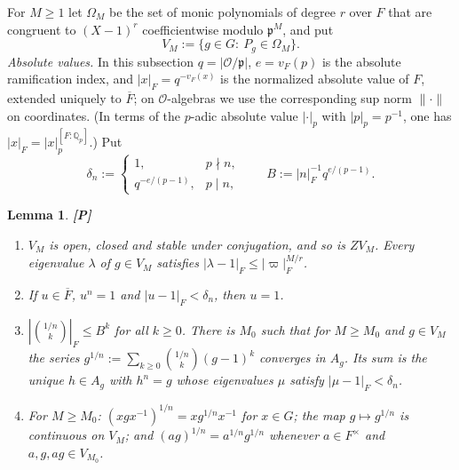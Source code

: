 \documentclass[12pt]{article}
\newcommand{\ov}[1]{\overline{#1}}
\newcommand{\cO}{\mathcal{O}}
\newcommand{\fp}{\mathfrak{p}}
\newcommand{\Pv}{\textbf{[P]}}
\theoremstyle{plain}
\newtheorem{lemma}[theorem]{Lemma}
\theoremstyle{definition}
\begin{document}
For $M\ge1$ let $\Omega_M$ be the set of monic polynomials of degree $r$ over $F$ that are congruent to $(X-1)^r$ coefficientwise modulo $\fp^M$, and put
\[ V_M:=\{g\in G:\ P_g\in\Omega_M\}. \]
\emph{Absolute values.} In this subsection $q=|\cO/\fp|$, $e=v_F(p)$ is the absolute ramification index, and $|x|_F=q^{-v_F(x)}$ is the normalized absolute value of $F$, extended uniquely to $\ov F$; on $\cO$-algebras we use the corresponding sup norm $\|\cdot\|$ on coordinates. (In terms of the $p$-adic absolute value $|\cdot|_p$ with $|p|_p=p^{-1}$, one has $|x|_F=|x|_p^{[F:\mathbb Q_p]}$.) Put
\[ \delta_n:=\begin{cases}1,&p\nmid n,\\ q^{-e/(p-1)},&p\mid n,\end{cases}\qquad B:=|n|_F^{-1}q^{e/(p-1)}. \]

\begin{lemma}\label{lem:roots}\Pv
\begin{enumerate}[label=(\alph*)]
\item $V_M$ is open, closed and stable under conjugation, and so is $ZV_M$. Every eigenvalue $\lambda$ of $g\in V_M$ satisfies $|\lambda-1|_F\le|\varpi|_F^{M/r}$.
\item If $u\in\ov F$, $u^n=1$ and $|u-1|_F<\delta_n$, then $u=1$.
\item $|\binom{1/n}{k}|_F\le B^k$ for all $k\ge0$. There is $M_0$ such that for $M\ge M_0$ and $g\in V_M$ the series $g^{1/n}:=\sum_{k\ge0}\binom{1/n}{k}(g-1)^k$ converges in $A_g$. Its sum is the unique $h\in A_g$ with $h^n=g$ whose eigenvalues $\mu$ satisfy $|\mu-1|_F<\delta_n$.
\item For $M\ge M_0$: $(xgx^{-1})^{1/n}=xg^{1/n}x^{-1}$ for $x\in G$; the map $g\mapsto g^{1/n}$ is continuous on $V_M$; and $(ag)^{1/n}=a^{1/n}g^{1/n}$ whenever $a\in F^\times$ and $a,g,ag\in V_{M_0}$.
\end{enumerate}
\end{lemma}
\end{document}
